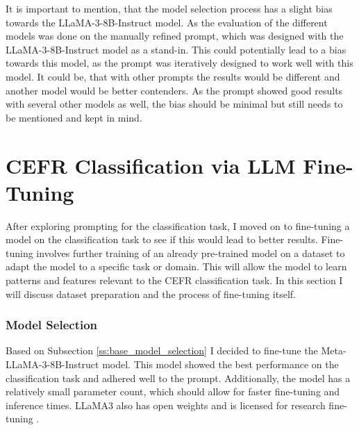 It is important to mention, that the model selection process has a slight bias towards the LLaMA-3-8B-Instruct model. As the evaluation of the different models was done on the manually refined prompt, which was designed with the LLaMA-3-8B-Instruct model as a stand-in. This could potentially lead to a bias towards this model, as the prompt was iteratively designed to work well with this model. It could be, that with other prompts the results would be different and another model would be better contenders. As the prompt showed good results with several other models as well, the bias should be minimal but still needs to be mentioned and kept in mind.
\section{CEFR Classification via LLM Fine-Tuning}
\label{s:llm_fine_tuning}

After exploring prompting for the classification task, I moved on to fine-tuning a model on the classification task to see if this would lead to better results. Fine-tuning involves further training of an already pre-trained model on a dataset to adapt the model to a specific task or domain. This will allow the model to learn patterns and features relevant to the CEFR classification task. In this section I will discuss dataset preparation and the process of fine-tuning itself.

\subsubsection{Model Selection}
\label{sss:model_selection}
Based on Subsection \ref{ss:base_model_selection} I decided to fine-tune the Meta-LLaMA-3-8B-Instruct model. This model showed the best performance on the classification task and adhered well to the prompt. Additionally, the model has a relatively small parameter count, which should allow for faster fine-tuning and inference times. LLaMA3 also has open weights and is licensed for research fine-tuning \citep{LLaMA3}.


